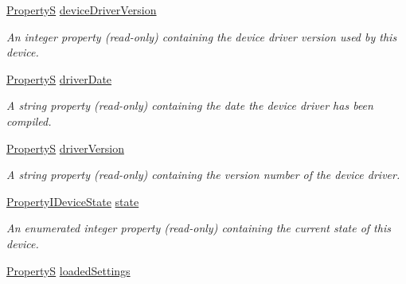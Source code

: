 \begin{DoxyCompactItemize}
\item 
\hyperlink{classmv_i_m_p_a_c_t_1_1acquire_1_1_property_s}{Property\+S} \hyperlink{classmv_i_m_p_a_c_t_1_1acquire_1_1_info_ac8609c004dae3b7462be59a8d88f6b26}{device\+Driver\+Version}
\begin{DoxyCompactList}\small\item\em An integer property {\bfseries }(read-\/only) containing the device driver version used by this device. \end{DoxyCompactList}\item 
\hypertarget{classmv_i_m_p_a_c_t_1_1acquire_1_1_info_abd24c12b7fb65f05a2180e4d00abbf62}{\hyperlink{classmv_i_m_p_a_c_t_1_1acquire_1_1_property_s}{Property\+S} \hyperlink{classmv_i_m_p_a_c_t_1_1acquire_1_1_info_abd24c12b7fb65f05a2180e4d00abbf62}{driver\+Date}}\label{classmv_i_m_p_a_c_t_1_1acquire_1_1_info_abd24c12b7fb65f05a2180e4d00abbf62}

\begin{DoxyCompactList}\small\item\em A string property {\bfseries }(read-\/only) containing the date the device driver has been compiled. \end{DoxyCompactList}\item 
\hypertarget{classmv_i_m_p_a_c_t_1_1acquire_1_1_info_a19ab962a85d1498b33691782dd9be0f1}{\hyperlink{classmv_i_m_p_a_c_t_1_1acquire_1_1_property_s}{Property\+S} \hyperlink{classmv_i_m_p_a_c_t_1_1acquire_1_1_info_a19ab962a85d1498b33691782dd9be0f1}{driver\+Version}}\label{classmv_i_m_p_a_c_t_1_1acquire_1_1_info_a19ab962a85d1498b33691782dd9be0f1}

\begin{DoxyCompactList}\small\item\em A string property {\bfseries }(read-\/only) containing the version number of the device driver. \end{DoxyCompactList}\item 
\hyperlink{group___common_interface_ga1127fb45b2263d328e769e81b1096baf}{Property\+I\+Device\+State} \hyperlink{classmv_i_m_p_a_c_t_1_1acquire_1_1_info_a90163f7be08608c332cec95faf55c93b}{state}
\begin{DoxyCompactList}\small\item\em An enumerated integer property {\bfseries }(read-\/only) containing the current state of this device. \end{DoxyCompactList}\item 
\hypertarget{classmv_i_m_p_a_c_t_1_1acquire_1_1_info_a49825ec79e3fb2e29734bb43335f75f3}{\hyperlink{classmv_i_m_p_a_c_t_1_1acquire_1_1_property_s}{Property\+S} \hyperlink{classmv_i_m_p_a_c_t_1_1acquire_1_1_info_a49825ec79e3fb2e29734bb43335f75f3}{loaded\+Settings}}\label{classmv_i_m_p_a_c_t_1_1acquire_1_1_info_a49825ec79e3fb2e29734bb43335f75f3}


\end{DoxyCompactItemize}
